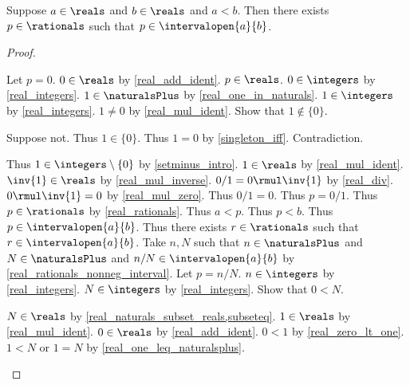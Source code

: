 \begin{theorem}\label{real_rational_open_interval}
    Suppose $a\in\reals$ and $b\in\reals$ and $a < b$.
    Then there exists $p\in\rationals$ such that $p\in\intervalopen{a}{b}$.
\end{theorem}
\begin{proof}
    \begin{byCase}
        \begin{byCase}
            Let $p = 0$.
            $0\in\reals$ by \cref{real_add_ident}.
            $p\in\reals$.
            $0\in\integers$ by \cref{real_integers}.
            $1\in\naturalsPlus$ by \cref{real_one_in_naturals}.
            $1\in\integers$ by \cref{real_integers}.
            $1\neq 0$ by \cref{real_mul_ident}.
            Show that $1\notin\{0\}$.
            \begin{subproof}
                Suppose not.
                Thus $1\in\{0\}$.
                Thus $1 = 0$ by \cref{singleton_iff}.
                Contradiction.
            \end{subproof}
            Thus $1\in\integers\setminus\{0\}$ by \cref{setminus_intro}.
            $1\in\reals$ by \cref{real_mul_ident}.
            $\inv{1}\in\reals$ by \cref{real_mul_inverse}.
            $0 / 1 = 0 \rmul \inv{1}$ by \cref{real_div}.
            $0 \rmul \inv{1} = 0$ by \cref{real_mul_zero}.
            Thus $0 / 1 = 0$.
            Thus $p = 0 / 1$.
            Thus $p\in\rationals$ by \cref{real_rationals}.
            Thus $a < p$.
            Thus $p < b$.
            Thus $p\in\intervalopen{a}{b}$.
            Thus there exists $r\in\rationals$ such that $r\in\intervalopen{a}{b}$.
            Take $n, N$ such that $n\in\naturalsPlus$ and $N\in\naturalsPlus$ and $n / N\in\intervalopen{a}{b}$ by \cref{real_rationals_nonneg_interval}.
            Let $p = n / N$.
            $n\in\integers$ by \cref{real_integers}.
            $N\in\integers$ by \cref{real_integers}.
            Show that $0 < N$.
            \begin{subproof}
                $N\in\reals$ by \cref{real_naturals_subset_reals,subseteq}.
                $1\in\reals$ by \cref{real_mul_ident}.
                $0\in\reals$ by \cref{real_add_ident}.
                $0 < 1$ by \cref{real_zero_lt_one}.
                $1 < N$ or $1 = N$ by \cref{real_one_leq_naturalsplus}.
                \begin{byCase}

\end{byCase}
\end{subproof}
\end{byCase}
\end{byCase}
\end{proof}
